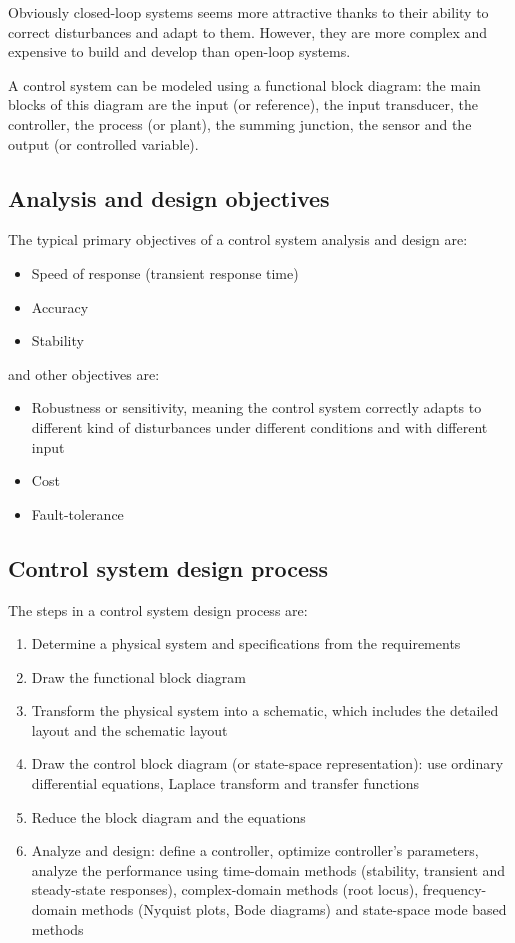 \documentclass[10pt, twocolumn]{article}
\begin{document}
Obviously closed-loop systems seems more attractive thanks to their ability to correct disturbances and adapt to them.
However, they are more complex and expensive to build and develop than open-loop systems.

A control system can be modeled using a functional block diagram: the main blocks of this diagram are the input (or reference), the input transducer, the controller, the process (or plant), the summing junction, the sensor and the output (or controlled variable).


\subsection{Analysis and design objectives}
The typical primary objectives of a control system analysis and design are:
\begin{itemize}
  \item Speed of response (transient response time)
  \item Accuracy
  \item Stability
\end{itemize}
and other objectives are:
\begin{itemize}
  \item Robustness or sensitivity, meaning the control system correctly adapts to different kind of disturbances under different conditions and with different input
  \item Cost
  \item Fault-tolerance
\end{itemize}


\subsection{Control system design process}
The steps in a control system design process are:
\begin{enumerate}
  \item Determine a physical system and specifications from the requirements
  \item Draw the functional block diagram
  \item Transform the physical system into a schematic, which includes the detailed layout and the schematic layout
  \item Draw the control block diagram (or state-space representation): use ordinary differential equations, Laplace transform and transfer functions
  \item Reduce the block diagram and the equations
  \item Analyze and design: define a controller, optimize controller's parameters, analyze the performance using time-domain methods (stability, transient and steady-state responses), complex-domain methods (root locus), frequency-domain methods (Nyquist plots, Bode diagrams) and state-space mode based methods
\end{enumerate}
\end{document}
